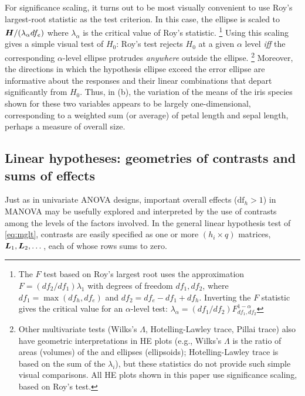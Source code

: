 For significance scaling, it turns out to be most visually convenient to
use Roy's largest-root statistic as the test criterion.
In this case,
the  ellipse is scaled to $\bm{H}/(\lambda_\alpha df_e)$
where $\lambda_\alpha$ is the critical value of Roy's statistic.%
\footnote{
The $F$ test based on Roy's largest root uses the approximation
$ F = (df_2 / df_1) \lambda_1$ with degrees of freedom $df_1, df_2$,
where $df_1 = \max (df_h, df_e)$ and $df_2 = df_e - df_1 + df_h$.
Inverting the $F$ statistic gives the critical value for an $\alpha$-level test:
$\lambda_\alpha = (df_1/df_2) F^{1-\alpha}_{df_1,df_2}$
}
Using this scaling gives a simple visual test of
$H_0$: Roy's test rejects $H_0$ at a given $\alpha$ level \emph{iff}
the corresponding $\alpha$-level  ellipse protrudes \emph{anywhere} outside the 
ellipse.%
\footnote{Other multivariate tests (Wilks's $\Lambda$, Hotelling-Lawley trace,
Pillai trace) also have geometric interpretations
in HE plots (e.g.,  Wilks's $\Lambda$ is the ratio of areas (volumes)
of the  and  ellipses (ellipsoids); Hotelling-Lawley trace
is based on the sum of the $\lambda_i$), but these statistics do not provide
such simple visual comparisons. All HE plots shown in this paper use
significance scaling, based on Roy's test.
}
Moreover, the directions in which the hypothesis ellipse exceed the error ellipse
are informative about the responses and their linear combinations that depart significantly
from $H_0$.  Thus, in (b), the variation of the means of the iris species
shown for these two variables
appears to be largely one-dimensional, corresponding to a weighted sum (or average) of petal length and
sepal length, perhaps a measure of overall size.


\subsection{Linear hypotheses: geometries of contrasts and sums of effects}

Just as in univariate ANOVA designs, important overall effects ($\textrm{df}_h>1$) in MANOVA may be usefully
explored and interpreted by the use of contrasts among the levels of the factors involved.
In the general linear hypothesis test of \eqref{eq:mglt}, contrasts are easily specified as one or more $(h_i \times q)$ 
matrices, $\bm{L}_1, \bm{L}_2, \dots $, each of whose rows sums to zero.

